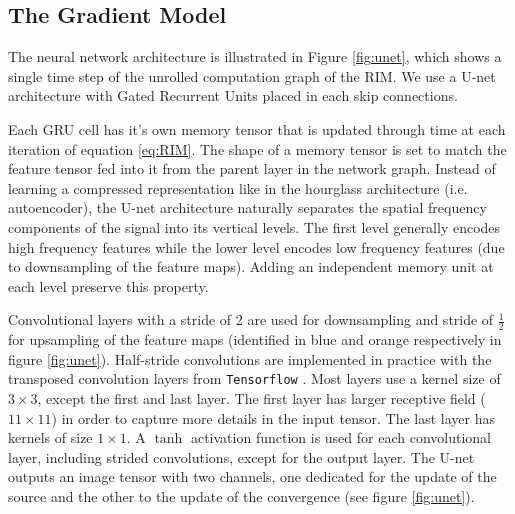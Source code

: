 \subsection{The Gradient Model}\label{sec:gradient model}


The neural network architecture is illustrated in Figure \ref{fig:unet}, which shows 
a single time step of the unrolled computation graph of the RIM.
We use a U-net \citep{Ronneberger2015} architecture 
with Gated Recurrent Units \citep[GRU:][]{Cho2014} placed in each skip connections. 

Each GRU cell has it's own memory tensor that is updated through time at each iteration of 
equation \ref{eq:RIM}. The shape of a memory tensor is set to match the
feature tensor fed into it from the parent layer in the network graph. 
Instead of learning a compressed representation like in the hourglass
architecture (i.e. autoencoder), the U-net architecture naturally separates the spatial 
frequency components of the signal into its vertical levels. The first level generally encodes 
high frequency features while the lower level encodes low frequency features (due to downsampling of the feature maps). 
Adding an independent memory unit 
at each level preserve this property.

Convolutional layers with a stride of 2 are used for downsampling and 
stride of $\frac{1}{2}$ for upsampling of the feature maps 
(identified in blue and orange respectively in figure \ref{fig:unet}). Half-stride convolutions are implemented in practice with the transposed convolution layers from \texttt{Tensorflow} \citep{tensorflow}.
Most layers use a kernel size of $3\times3$, except the first and last layer. 
The first layer has 
larger receptive field ($11\times11$) in order to capture more details in the input tensor. 
The last layer has kernels of size $1\times 1$. 
A $\tanh$ 
activation function is used 
for each convolutional layer, including strided convolutions, except for the output 
layer. The U-net outputs an image tensor with two channels, one dedicated for the update of the source 
and the other to the update of the convergence (see figure \ref{fig:unet}). 




